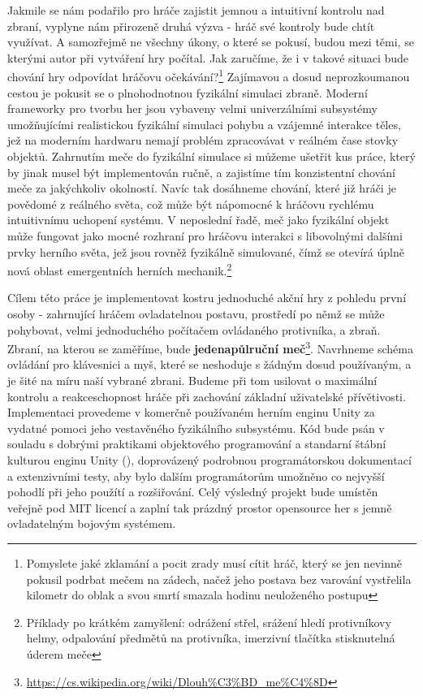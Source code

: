 Jakmile se nám podařilo pro hráče zajistit jemnou a intuitivní kontrolu nad zbraní, vyplyne nám přirozeně druhá výzva - hráč své kontroly bude chtít využívat. A samozřejmě ne všechny úkony, o které se pokusí, budou mezi těmi, se kterými autor při vytváření hry počítal. Jak zaručíme, že i v takové situaci bude chování hry odpovídat hráčovu očekávání?\footnote{Pomyslete jaké zklamání a pocit zrady musí cítit hráč, který se jen nevinně pokusil podrbat mečem na zádech, načež jeho postava bez varování vystřelila kilometr do oblak a svou smrtí smazala hodinu neuloženého postupu} Zajímavou a dosud neprozkoumanou cestou je pokusit se o plnohodnotnou fyzikální simulaci zbraně. Moderní frameworky pro tvorbu her jsou vybaveny velmi univerzálními subsystémy umožňujícími realistickou fyzikální simulaci pohybu a vzájemné interakce těles, jež na moderním hardwaru nemají problém zpracovávat v reálném čase stovky objektů. Zahrnutím meče do fyzikální simulace si můžeme ušetřit kus práce, který by jinak musel být implementován ručně, a zajistíme tím konzistentní chování meče za jakýchkoliv okolností. Navíc tak dosáhneme chování, které již hráči je povědomé z reálného světa, což může být nápomocné k hráčovu rychlému intuitivnímu uchopení systému. V neposlední řadě, meč jako fyzikální objekt může fungovat jako mocné rozhraní pro hráčovu interakci s libovolnými dalšími prvky herního světa, jež jsou rovněž fyzikálně simulované, čímž se otevírá úplně nová oblast emergentních herních mechanik.\footnote{Příklady po krátkém zamyšlení: odrážení střel, srážení hledí protivníkovy helmy, odpalování předmětů na protivníka, imerzivní tlačítka stisknutelná úderem meče}

Cílem této práce je implementovat kostru jednoduché akční hry z pohledu první osoby - zahrnující hráčem ovladatelnou postavu, prostředí po němž se může pohybovat, velmi jednoduchého počítačem ovládaného protivníka, a zbraň. Zbraní, na kterou se zaměříme, bude \textbf{jedenapůlruční meč}\footnote{\url{https://cs.wikipedia.org/wiki/Dlouh\%C3\%BD_me\%C4\%8D}}. Navrhneme schéma ovládání pro klávesnici a myš, které se neshoduje s žádným dosud používaným, a je šité na míru naší vybrané zbrani. Budeme při tom usilovat o maximální kontrolu a reakceschopnost hráče při zachování základní uživatelské přívětivosti. Implementaci provedeme v komerčně používaném herním enginu Unity za vydatné pomoci jeho vestavěného fyzikálního subsystému. Kód bude psán v souladu s dobrými praktikami objektového programování a standarní štábní kulturou enginu Unity (\citet{Unity}), doprovázený podrobnou programátorskou dokumentací a extenzivními testy, aby bylo dalším programátorům umožněno co nejvyšší pohodlí při jeho použítí a rozšiřování. Celý výsledný projekt bude umístěn veřejně pod MIT licencí a zaplní tak prázdný prostor opensource her s jemně ovladatelným bojovým systémem.


